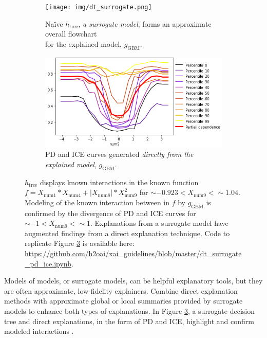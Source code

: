 \documentclass[sigconf]{acmart}
\begin{document}
\begin{figure}[htb!]
	\begin{subfigure}{.55\textwidth}	\centering
		\texttt{[image: img/dt\_surrogate.png]}
  		\caption{Na\"ive $h_{\text{tree}}$, \textit{a surrogate model}, forms an approximate overall flowchart\\ for the explained model, $g_{\text{GBM}}$.}
  		\label{fig:dt_surrogate}
	\end{subfigure}\hfill
	\begin{subfigure}{.45\textwidth}	\centering
  		\includegraphics[height=0.4\linewidth, width=0.75\linewidth]{img/pdp_ice.png}
  		\caption{PD and ICE curves generated \textit{directly from the explained model}, $g_{\text{GBM}}$.}
  		\label{fig:pdp_ice}
	\end{subfigure} \vspace{-5pt}
	\caption{$h_{\text{tree}}$ displays known interactions in the known function $f = X_{\text{num}1} * X_{\text{num}4} + |X_{\text{num}8}| * X_{\text{num}9}^2$ for $\sim -0.923 < X_{\text{num9}} <  \sim 1.04$. Modeling of the known interaction between in $f$ by $g_{\text{GBM}}$ is confirmed by the divergence of PD and ICE curves for $\sim -1 < X_{\text{num9}} <  \sim 1$. Explanations from a surrogate model have augmented findings from a direct explanation technique. Code to replicate Figure \ref{fig:pdp_ice_dt_surrogate} is available here: \url{https://github.com/h2oai/xai_guidelines/blob/master/dt_surrogate_pd_ice.ipynb}.}
	\label{fig:pdp_ice_dt_surrogate}
\end{figure}

Models of models, or surrogate models, can be helpful explanatory tools, but they are often approximate, low-fidelity explainers. Combine direct explanation methods with approximate global or local summaries provided by surrogate models to enhance both types of explanations. In Figure \ref{fig:pdp_ice_dt_surrogate}, a surrogate decision tree and direct explanations, in the form of PD and ICE, highlight and confirm modeled interactions \cite{art_and_sci}.
\end{document}
